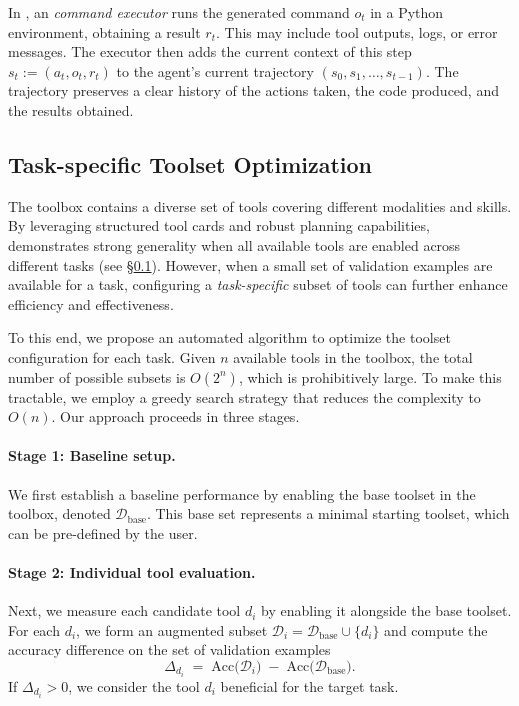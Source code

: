 In \model, an \emph{command executor} runs the generated command $o_t$ in a Python environment, obtaining a result $r_t$. This may include tool outputs, logs, or error messages. The executor then adds the current context of this step $s_t:=(a_t, o_t, r_t)$ to the agent’s current trajectory $(s_0, s_1, \ldots, s_{t-1})$. The trajectory preserves a clear history of the actions taken, the code produced, and the results obtained. 


\subsection{Task-specific Toolset Optimization}
\label{sec:toolset_optimization}

The \model toolbox contains a diverse set of tools covering different modalities and skills. By leveraging structured tool cards and robust planning capabilities, \model demonstrates strong generality when all available tools are enabled across different tasks (see \S\ref{sec:toolset_optimization}). However, when a small set of validation examples are available for a task, configuring a \emph{task-specific} subset of tools can further enhance efficiency and effectiveness.

To this end, we propose an automated algorithm to optimize the toolset configuration for each task. Given $n$ available tools in the toolbox, the total number of possible subsets is $O(2^n)$, which is prohibitively large. To make this tractable, we employ a greedy search strategy that reduces the complexity to $O(n)$. Our approach proceeds in three stages. 



\paragraph{Stage 1: Baseline setup.} 
We first establish a baseline performance by enabling the base toolset in the toolbox, denoted $\mathcal{D}_\text{base}$. This base set represents a minimal starting toolset, which can be pre-defined by the user. 

\paragraph{Stage 2: Individual tool evaluation.}
Next, we measure each candidate tool $d_i$ by enabling it alongside the base toolset. For each $d_i$, we form an augmented subset 
$\mathcal{D}_i = \mathcal{D}_\text{base} \cup \{d_i\}$ and compute the accuracy difference on the set of validation examples
\begin{equation}
\Delta_{d_i} \;=\; \text{Acc}\bigl(\mathcal{D}_i\bigr) \;-\; \text{Acc}\bigl(\mathcal{D}_\text{base}\bigr).
\end{equation}
If $\Delta_{d_i} > 0$, we consider the tool $d_i$ beneficial for the target task.

